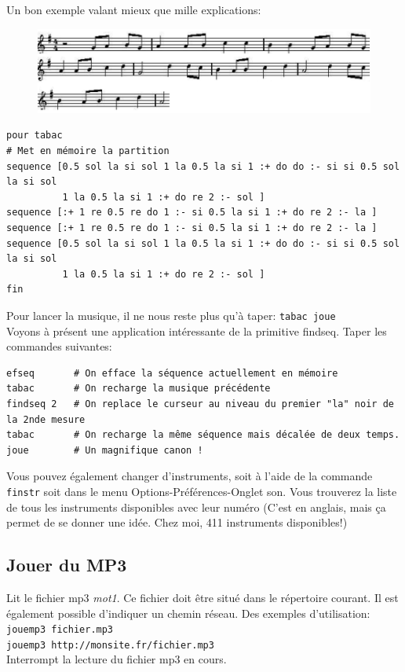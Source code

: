 Un bon exemple valant mieux que mille explications:\\
\begin{figure}[h]
\includegraphics{images/partition.png}
\end{figure}
\begin{verbatim}
pour tabac
# Met en mémoire la partition
sequence [0.5 sol la si sol 1 la 0.5 la si 1 :+ do do :- si si 0.5 sol la si sol
          1 la 0.5 la si 1 :+ do re 2 :- sol ]
sequence [:+ 1 re 0.5 re do 1 :- si 0.5 la si 1 :+ do re 2 :- la ]
sequence [:+ 1 re 0.5 re do 1 :- si 0.5 la si 1 :+ do re 2 :- la ]
sequence [0.5 sol la si sol 1 la 0.5 la si 1 :+ do do :- si si 0.5 sol la si sol
          1 la 0.5 la si 1 :+ do re 2 :- sol ]
fin
\end{verbatim}

Pour lancer la musique, il ne nous reste plus qu'à taper: \texttt{tabac joue}\\
Voyons à présent une application intéressante de la primitive {findseq}.
Taper les commandes suivantes:\\

\begin{verbatim}
efseq       # On efface la séquence actuellement en mémoire
tabac       # On recharge la musique précédente
findseq 2   # On replace le curseur au niveau du premier "la" noir de la 2nde mesure
tabac       # On recharge la même séquence mais décalée de deux temps.
joue        # Un magnifique canon !
\end{verbatim}

Vous pouvez également changer d'instruments, soit à l'aide de la commande \texttt{finstr} soit dans le menu Options-Préférences-Onglet son. Vous trouverez la liste de tous les instruments disponibles avec leur numéro (C'est en anglais, mais ça permet de se donner une idée. Chez moi, 411 instruments disponibles!)
\subsection{Jouer du MP3}
\noindent{}
Lit le fichier mp3 \textit{mot1}. Ce fichier doit être situé dans le répertoire courant. Il est également possible d'indiquer un chemin réseau. Des exemples d'utilisation: \\
\texttt{jouemp3 fichier.mp3}\\
\texttt{jouemp3 http://monsite.fr/fichier.mp3}\\
Interrompt la lecture du fichier mp3 en cours.
